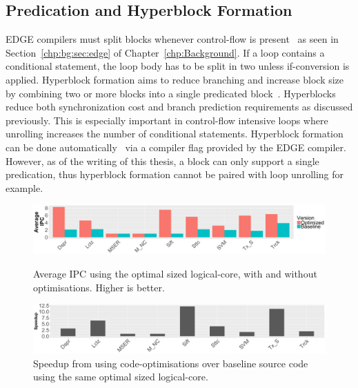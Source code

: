 \subsection{Predication and Hyperblock Formation}
EDGE compilers must split blocks whenever control-flow is present~\cite{smith2006edge} as seen in Section~\ref{chp:bg:sec:edge} of Chapter~\ref{chp:Background}.
If a loop contains a conditional statement, the loop body has to be split in two unless if-conversion is applied.
Hyperblock formation aims to reduce branching and increase block size by combining two or more blocks into a single predicated block~\cite{smith2006edge}.
Hyperblocks reduce both synchronization cost and branch prediction requirements as discussed previously.
This is especially important in control-flow intensive loops where unrolling increases the number of conditional statements.
Hyperblock formation can be done automatically~\cite{smith2006edge} via a compiler flag provided by the EDGE compiler.
However, as of the writing of this thesis, a block can only support a single predication, thus hyperblock formation cannot be paired with loop unrolling for example.

\begin{figure}[t]
     \centering
     \includegraphics[width=\textwidth]{cases-paper/graphics/Exploration/ipc_comp.pdf}
\vspace*{-8mm}
     \caption{Average IPC using the optimal sized logical-core, with and without optimisations. Higher is better.}
     \label{fig:ipccom}
     \vspace{0.5em}
\vspace{5mm}
    \centering
    \includegraphics[width=\textwidth]{cases-paper/graphics/Exploration/comp_speed.pdf}
\vspace*{-8mm}
    \caption{Speedup from using code-optimisations over baseline source code using the same optimal sized logical-core.}
    \label{fig:speedcomp}
\vspace{5mm}
\end{figure}

